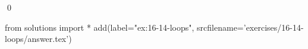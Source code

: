 
\begin{ex}
  \label{ex:16-14-loops}
  
  \qed
\end{ex}
\begin{python0}
from solutions import *
add(label="ex:16-14-loops",
    srcfilename='exercises/16-14-loops/answer.tex')
\end{python0}
